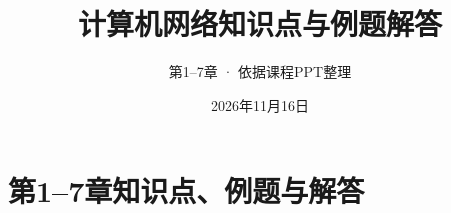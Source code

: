 \documentclass[openany,lang=cn,newtx,11pt,scheme=chinese,color=blue,mode=fancy,bibtex]{elegantbook}
\title{计算机网络知识点与例题解答}
\subtitle{第1--7章 · 依据课程PPT整理}
\author{}
\date{2026年11月16日}
\begin{document}
\raggedbottom
\fancyhead[R]{\color{structurecolor}\cnormal\leftmark}
\maketitle
\frontmatter
\tableofcontents
\mainmatter

\part{第1--7章知识点、例题与解答}







\end{document}
